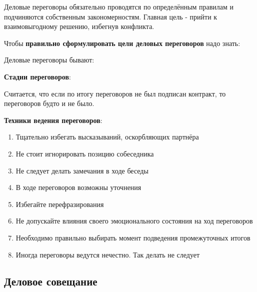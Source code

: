 \documentclass[a4paper,14pt]{extarticle}
\begin{document}
Деловые переговоры обязательно проводятся по определённым правилам и подчиняются собственным закономерностям. Главная цель - прийти к взаимовыгодному решению, избегнув конфликта.

Чтобы \textbf{правильно сформулировать цели деловых переговоров} надо знать:

\begin{multienumerate}
\end{multienumerate}

Деловые переговоры бывают:

\begin{multienumerate}
\end{multienumerate}

\textbf{Стадии переговоров}:

\begin{multienumerate}
\end{multienumerate}

Считается, что если по итогу переговоров не был подписан контракт, то переговоров будто и не было.

\textbf{Техники ведения переговоров}:

\begin{enumerate}
    \item Тщательно избегать высказываний, оскорбляющих партнёра
    \item Не стоит игнорировать позицию собеседника
    \item Не следует делать замечания в ходе беседы
    \item В ходе переговоров возможны уточнения
    \item Избегайте перефразирования
    \item Не допускайте влияния своего эмоционального состояния на ход переговоров
    \item Необходимо правильно выбирать момент подведения промежуточных итогов
    \item Иногда переговоры ведутся нечестно. Так делать не следует
\end{enumerate}

\subsection{Деловое совещание}
\end{document}

